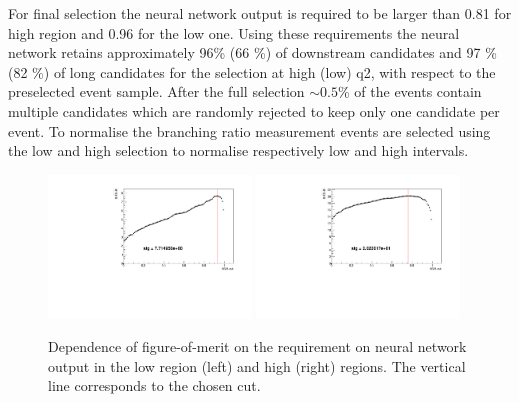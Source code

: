 For final selection the neural network output is required to be larger than 0.81 for high \qsq region
and 0.96 for the low \qsq one. Using these requirements the neural network retains approximately 96\% (66 \%)
of downstream candidates and 97 \% (82 \%) of long candidates for the selection at high (low) q2, with respect to
the preselected event sample. After the full selection $\sim 0.5$\% of the events contain multiple candidates
which are randomly rejected to keep only one candidate per event. 
%
%
To normalise the branching ratio measurement \jpsi events are selected using the low and high \qsq selection to normalise
respectively low and high \qsq intervals. 
%
\begin{figure}
\centering
\includegraphics[width=0.48\textwidth]{Lmumu/figs/significance_Lmumu_lowQ2.pdf}
\includegraphics[width=0.48\textwidth]{Lmumu/figs/significance_Lmumu_highQ2.pdf}
\caption{Dependence of figure-of-merit on the requirement on neural network output in the low \qsq
region (left) and high \qsq (right) regions. The vertical line corresponds to the chosen cut.}
\label{fig:Lb_FOM}
\end{figure}
%

